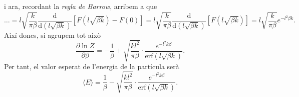 \documentclass[a4paper, 10pt]{article}
\begin{document}
\begin{enumerate}
i ara, recordant la \textit{regla de Barrow}, arribem a que
\begin{equation*}
	\ldots = l \sqrt{\frac{k}{\pi \beta}}\frac{\mathrm{d}}{\mathrm{d}(l\sqrt{\beta k})}\left[F(l\sqrt{\beta k})- F(0)\right] = l \sqrt{\frac{k}{\pi \beta}}\frac{\mathrm{d}}{\mathrm{d}(l\sqrt{\beta k})}\left[F(l\sqrt{\beta k})\right] = l \sqrt{\frac{k}{\pi \beta}} e^{-l^2\beta k}.
\end{equation*}
Així doncs, si agrupem tot això
\begin{equation}
	\frac{\partial \ln Z}{\partial \beta} = -\frac{1}{\beta} + \sqrt{\frac{kl^2}{\pi \beta}} \cdot \frac{e^{-l^2k\beta}}{\mathrm{erf}(l\sqrt{\beta k})}. \label{eqb2:3}
\end{equation}
Per tant, el valor esperat de l'energia de la partícula serà
\begin{equation}
	\boxed{\langle E \rangle = \frac{1}{\beta} - \sqrt{\frac{kl^2}{\pi \beta}} \cdot \frac{e^{-l^2k\beta}}{\mathrm{erf}(l\sqrt{\beta k})}}. \label{eqb2:4}
\end{equation}


\end{enumerate}
\end{document}
